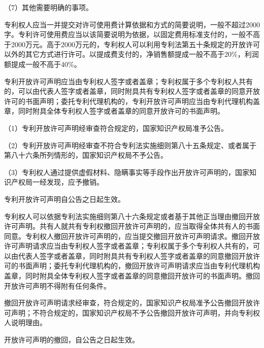{\setlength{\parindent}{17.1bp}（7）其他需要明确的事项。\par}

专利权人应当一并提交对许可使用费计算依据和方式的简要说明，一般不超过2000字。专利许可使用费应当以该简要说明为依据，以固定费用标准支付的，一般不高于2000万元。高于2000万元的，专利权人可以利用专利法第五十条规定的开放许可以外的其它方式进行许可。以提成费支付的，净销售额提成一般不高于20\%，利润额提成一般不高于40\%。

专利开放许可声明应当由专利权人签字或者盖章；专利权属于多个专利权人共有的，可以由代表人签字或者盖章，同时附具共有专利权人签字或者盖章的同意开放许可的书面声明；委托专利代理机构的，专利开放许可声明应当由专利代理机构盖章，同时附具全体专利权人签字或者盖章的同意开放许可的书面声明。

{\setlength{\parindent}{17.1bp}（1）专利开放许可声明经审查符合规定的，国家知识产权局准予公告。\par}

{\setlength{\parindent}{17.1bp}（2）专利开放许可声明经审查不符合专利法实施细则第八十五条规定、或者属于第八十六条所列情形的，国家知识产权局不予公告。\par}

{\setlength{\parindent}{17.1bp}（3）专利权人通过提供虚假材料、隐瞒事实等手段作出开放许可声明的，国家知识产权局一经发现，应予撤销。\par}

专利开放许可声明自公告之日起生效。

专利权人可以依据专利法实施细则第八十六条规定或者基于其他正当理由撤回开放许可声明。共有人就共有专利权撤回开放许可声明的，应当取得全体共有人的书面同意。专利权人撤回开放许可声明的，应当提交撤回开放许可声明请求。撤回开放许可声明请求应当由专利权人签字或者盖章；专利权属于多个专利权人共有的，可以由代表人签字或者盖章，同时附具共有专利权人签字或者盖章的同意撤回开放许可的书面声明；委托专利代理机构的，撤回开放许可声明请求应当由专利代理机构盖章，同时附具全体专利权人签字或者盖章的同意撤回开放许可的书面声明。撤回开放许可声明不得附有任何条件。

撤回开放许可声明请求经审查，符合规定的，国家知识产权局准予公告撤回开放许可声明；不符合规定的，国家知识产权局不予公告撤回开放许可声明，并向专利权人说明理由。

开放许可声明的撤回，自公告之日起生效。


